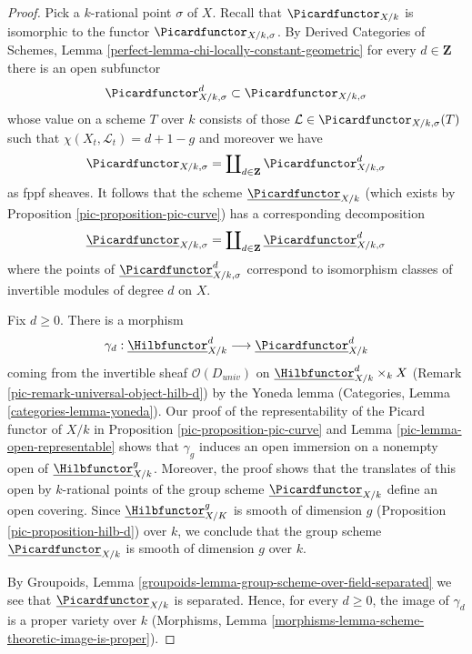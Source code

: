 \begin{proof}

Pick a $k$-rational point $\sigma$ of $X$. Recall that $\Picardfunctor_{X/k}$
is isomorphic to the functor $\Picardfunctor_{X/k, \sigma}$. By
Derived Categories of Schemes, Lemma
\ref{perfect-lemma-chi-locally-constant-geometric}
for every $d \in \mathbf{Z}$ there is an open subfunctor
$$
\Picardfunctor^d_{X/k, \sigma} \subset \Picardfunctor_{X/k, \sigma}
$$
whose value on a scheme $T$ over $k$ consists of those
$\mathcal{L} \in \Picardfunctor_{X/k, \sigma}(T)$ such that
$\chi(X_t, \mathcal{L}_t) = d + 1 - g$ and moreover we have
$$
\Picardfunctor_{X/k, \sigma} =
\coprod\nolimits_{d \in \mathbf{Z}} \Picardfunctor^d_{X/k, \sigma}
$$
as fppf sheaves. It follows that the scheme $\underline{\Picardfunctor}_{X/k}$
(which exists by Proposition \ref{pic-proposition-pic-curve})
has a corresponding decomposition
$$
\underline{\Picardfunctor}_{X/k, \sigma} =
\coprod\nolimits_{d \in \mathbf{Z}} \underline{\Picardfunctor}^d_{X/k, \sigma}
$$
where the points of $\underline{\Picardfunctor}^d_{X/k, \sigma}$ correspond
to isomorphism classes of invertible modules of degree $d$ on $X$.

\medskip\noindent
Fix $d \geq 0$. There is a morphism
$$
\gamma_d :
\underline{\Hilbfunctor}^d_{X/k}
\longrightarrow
\underline{\Picardfunctor}^d_{X/k}
$$
coming from the invertible sheaf $\mathcal{O}(D_{univ})$ on
$\underline{\Hilbfunctor}^d_{X/k} \times_k X$
(Remark \ref{pic-remark-universal-object-hilb-d}) by the Yoneda lemma
(Categories, Lemma \ref{categories-lemma-yoneda}).
Our proof of the representability of the Picard functor of $X/k$
in Proposition \ref{pic-proposition-pic-curve} and
Lemma \ref{pic-lemma-open-representable} shows that $\gamma_g$
induces an open immersion on a nonempty open of
$\underline{\Hilbfunctor}^g_{X/k}$. Moreover, the proof shows
that the translates of this open by $k$-rational points of
the group scheme $\underline{\Picardfunctor}_{X/k}$ define
an open covering. Since
$\underline{\Hilbfunctor}^g_{X/K}$ is smooth of dimension $g$
(Proposition \ref{pic-proposition-hilb-d})
over $k$, we conclude that the
group scheme $\underline{\Picardfunctor}_{X/k}$ is smooth of dimension $g$
over $k$.

\medskip\noindent
By Groupoids, Lemma \ref{groupoids-lemma-group-scheme-over-field-separated}
we see that $\underline{\Picardfunctor}_{X/k}$ is separated.
Hence, for every $d \geq 0$, the image of $\gamma_d$
is a proper variety over $k$
(Morphisms, Lemma \ref{morphisms-lemma-scheme-theoretic-image-is-proper}).


\end{proof}
